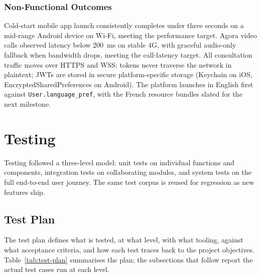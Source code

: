 \subsubsection*{Non-Functional Outcomes}

Cold-start mobile app launch consistently completes under three seconds on a mid-range Android device on Wi-Fi, meeting the performance target. Agora video calls observed latency below 200~ms on stable 4G, with graceful audio-only fallback when bandwidth drops, meeting the call-latency target. All consultation traffic moves over HTTPS and WSS; tokens never traverse the network in plaintext; JWTs are stored in secure platform-specific storage (Keychain on iOS, EncryptedSharedPreferences on Android). The platform launches in English first against \texttt{User.language\_pref}, with the French resource bundles slated for the next milestone.

\section{Testing}
\label{sec:impl-testing}

Testing followed a three-level model: unit tests on individual functions and components, integration tests on collaborating modules, and system tests on the full end-to-end user journey. The same test corpus is reused for regression as new features ship.

\subsection*{Test Plan}

The test plan defines what is tested, at what level, with what tooling, against what acceptance criteria, and how each test traces back to the project objectives. Table~\ref{tab:test-plan} summarises the plan; the subsections that follow report the actual test cases run at each level.


